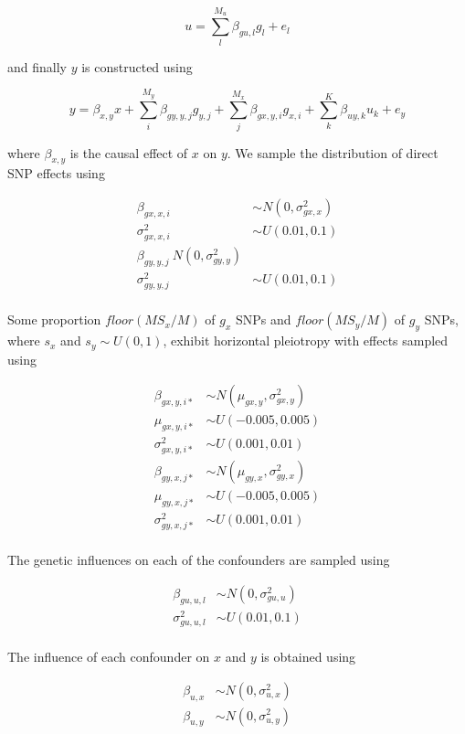 \documentclass[]{article}
\begin{document}
\[
u = \sum^{M_u}_{l}{\beta_{gu,l}g_{l}} + e_{l}
\]

and finally \(y\) is constructed using

\[
y = \beta_{x,y}x + \sum^{M_y}_{i}{\beta_{gy,y,j}g_{y,j}} + \sum^{M_x}_{j}{\beta_{gx,y,i}g_{x,i}} + \sum^{K}_{k}{\beta_{uy,k} u_{k}} + e_{y}
\]

where \(\beta_{x,y}\) is the causal effect of \(x\) on \(y\). We sample
the distribution of direct SNP effects using

\[
\begin{aligned}
\beta_{gx,x,i} & \sim N(0, \sigma^2_{gx,x}) \\
\sigma^2_{gx,x,i} & \sim U(0.01, 0.1) \\
\beta_{gy,y,j} ~ N(0, \sigma^2_{gy,y}) \\
\sigma^2_{gy,y,j} & \sim U(0.01, 0.1) \\
\end{aligned}
\]

Some proportion \(floor(MS_{x}/M)\) of \(g_x\) SNPs and
\(floor(MS_{y}/M)\) of \(g_y\) SNPs, where \(s_x\) and
\(s_y \sim U(0,1)\), exhibit horizontal pleiotropy with effects sampled
using

\[
\begin{aligned}
\beta_{gx,y,i*} & \sim N(\mu_{gx,y}, \sigma^2_{gx,y})  \\
\mu_{gx,y,i*} & \sim U(-0.005, 0.005) \\
\sigma^2_{gx,y,i*} & \sim U(0.001, 0.01) \\
\beta_{gy,x,j*} & \sim N(\mu_{gy,x}, \sigma^2_{gy,x}) \\
\mu_{gy,x,j*} & \sim U(-0.005, 0.005) \\
\sigma^2_{gy,x,j*} & \sim U(0.001, 0.01) \\
\end{aligned}
\]

The genetic influences on each of the confounders are sampled using

\[
\begin{aligned}
\beta_{gu,u,l} & \sim N(0, \sigma^2_{gu,u}) \\
\sigma^2_{gu,u,l} & \sim U(0.01, 0.1) \\
\end{aligned}
\]

The influence of each confounder on \(x\) and \(y\) is obtained using

\[
\begin{aligned}
\beta_{u,x} & \sim N(0, \sigma^{2}_{u,x}) \\
\beta_{u,y} & \sim N(0, \sigma^{2}_{u,y}) \\
\end{aligned}
\]
\end{document}
